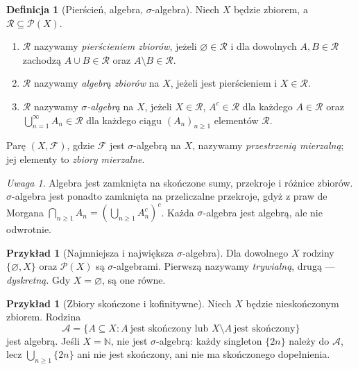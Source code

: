 \documentclass[11pt,a4paper,oneside]{book}
\numberwithin{equation}{chapter}
\theoremstyle{plain}
\theoremstyle{definition}
\newtheorem{definicja}[twierdzenie]{Definicja}
\newtheorem{przyklad}[twierdzenie]{Przykład}
\theoremstyle{remark}
\newtheorem{uwaga}[twierdzenie]{Uwaga}
\begin{document}
\begin{definicja}[Pierścień, algebra, $\sigma$-algebra]
\label{def:algebry}
Niech $X$ będzie zbiorem, a $\mathcal R\subseteq\mathcal P(X)$.
\begin{enumerate}
\item $\mathcal R$ nazywamy \emph{pierścieniem zbiorów}, jeżeli
$\varnothing\in\mathcal R$ i dla dowolnych $A,B\in\mathcal R$ zachodzą
$A\cup B\in\mathcal R$ oraz $A\setminus B\in\mathcal R$.
\item $\mathcal R$ nazywamy \emph{algebrą zbiorów} na $X$, jeżeli jest
pierścieniem i $X\in\mathcal R$.
\item $\mathcal R$ nazywamy \emph{$\sigma$-algebrą} na $X$, jeżeli
$X\in\mathcal R$, $A^c\in\mathcal R$ dla każdego $A\in\mathcal R$ oraz
$\bigcup_{n=1}^{\infty}A_n\in\mathcal R$ dla każdego ciągu
$(A_n)_{n\geq1}$ elementów $\mathcal R$.
\end{enumerate}
Parę $(X,\mathcal F)$, gdzie $\mathcal F$ jest $\sigma$-algebrą na $X$,
nazywamy \emph{przestrzenią mierzalną}; jej elementy to \emph{zbiory
mierzalne}.
\end{definicja}

\begin{uwaga}
Algebra jest zamknięta na skończone sumy, przekroje i różnice zbiorów.
$\sigma$-algebra jest ponadto zamknięta na przeliczalne przekroje, gdyż
z praw de Morgana
$\bigcap_{n\geq1}A_n=(\bigcup_{n\geq1}A_n^c)^c$.
Każda $\sigma$-algebra jest algebrą, ale nie odwrotnie.
\end{uwaga}

\begin{przyklad}[Najmniejsza i największa $\sigma$-algebra]
Dla dowolnego $X$ rodziny $\{\varnothing,X\}$ oraz $\mathcal P(X)$ są
$\sigma$-algebrami. Pierwszą nazywamy \emph{trywialną}, drugą ---
\emph{dyskretną}. Gdy $X=\varnothing$, są one równe.
\end{przyklad}

\begin{przyklad}[Zbiory skończone i kofinitywne]
\label{ex:finite-cofinite}
Niech $X$ będzie nieskończonym zbiorem. Rodzina
\[
\mathcal A=\{A\subseteq X:A\ \text{jest skończony lub }X\setminus A
\ \text{jest skończony}\}
\]
jest algebrą. Jeśli $X=\mathbb N$, nie jest $\sigma$-algebrą:
każdy singleton $\{2n\}$ należy do $\mathcal A$, lecz
$\bigcup_{n\geq1}\{2n\}$ ani nie jest skończony, ani nie ma skończonego
dopełnienia.
\end{przyklad}
\end{document}
